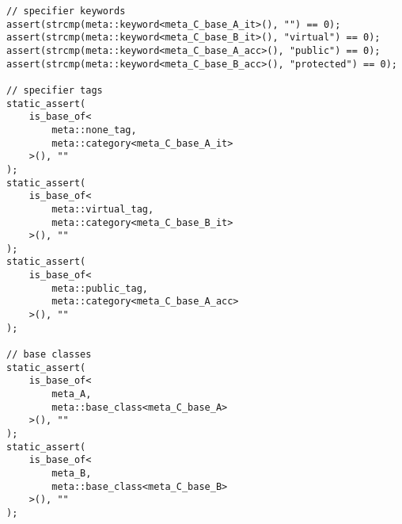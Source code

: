 \begin{verbatim}
// specifier keywords
assert(strcmp(meta::keyword<meta_C_base_A_it>(), "") == 0);
assert(strcmp(meta::keyword<meta_C_base_B_it>(), "virtual") == 0);
assert(strcmp(meta::keyword<meta_C_base_A_acc>(), "public") == 0);
assert(strcmp(meta::keyword<meta_C_base_B_acc>(), "protected") == 0);

// specifier tags
static_assert(
	is_base_of<
		meta::none_tag,
		meta::category<meta_C_base_A_it>
	>(), ""
);
static_assert(
	is_base_of<
		meta::virtual_tag,
		meta::category<meta_C_base_B_it>
	>(), ""
);
static_assert(
	is_base_of<
		meta::public_tag,
		meta::category<meta_C_base_A_acc>
	>(), ""
);

// base classes
static_assert(
	is_base_of<
		meta_A,
		meta::base_class<meta_C_base_A>
	>(), ""
);
static_assert(
	is_base_of<
		meta_B,
		meta::base_class<meta_C_base_B>
	>(), ""
);

\end{verbatim}

